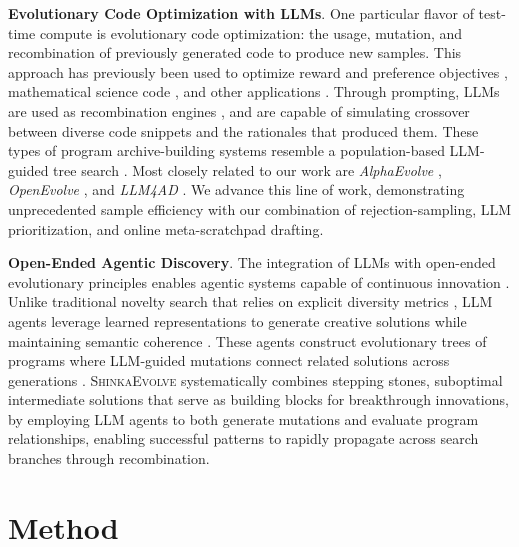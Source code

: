 \documentclass[11pt, a4paper]{include/gdm_format}
\newcommand{\ouralgo}{\textsc{ShinkaEvolve}\xspace}
\begin{document}
\textbf{Evolutionary Code Optimization with LLMs}. One particular flavor of test-time compute is evolutionary code optimization: the usage, mutation, and recombination of previously generated code to produce new samples. This approach has previously been used to optimize reward and preference objectives \citep{lu2024discovering, ma2023eureka}, mathematical science code \citep{romera2024mathematical}, and other applications \citep{lehman2022evolutionlargemodels, lange2024large, meyerson2023language, berman2025record, lange2025ai}. Through prompting, LLMs are used as recombination engines \citep{lange2023discovering_es, meyerson2023language}, and are capable of simulating crossover between diverse code snippets and the rationales that produced them. These types of program archive-building systems resemble a population-based LLM-guided tree search \citep{jiang2025aide, inoue2025wider}. Most closely related to our work are \textit{AlphaEvolve} \citep{novikov2025alphaevolve}, \textit{OpenEvolve} \citep{openevolve}, and \textit{LLM4AD} \citep{liu2024llm4ad}. We advance this line of work, demonstrating unprecedented sample efficiency with our combination of rejection-sampling, LLM prioritization, and online meta-scratchpad drafting.


\textbf{Open-Ended Agentic Discovery}. The integration of LLMs with open-ended evolutionary principles enables agentic systems capable of continuous innovation \citep{stanley2017open, zhang2025darwin}. Unlike traditional novelty search that relies on explicit diversity metrics \citep{lehman2008exploiting, lehman2011abandoning}, LLM agents leverage learned representations to generate creative solutions while maintaining semantic coherence \citep{omniepic, hu2024automated, novikov2025alphaevolve}. These agents construct evolutionary trees of programs where LLM-guided mutations connect related solutions across generations \citep{lehman2020surprising}. \ouralgo systematically combines stepping stones, suboptimal intermediate solutions that serve as building blocks for breakthrough innovations, by employing LLM agents to both generate mutations and evaluate program relationships, enabling successful patterns to rapidly propagate across search branches through recombination.



\section{Method}
\label{sec:method}
\end{document}
